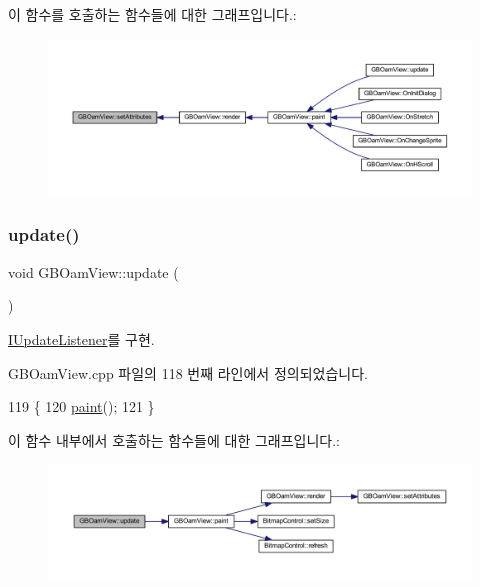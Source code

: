 이 함수를 호출하는 함수들에 대한 그래프입니다.\+:
\nopagebreak
\begin{figure}[H]
\begin{center}
\leavevmode
\includegraphics[width=350pt]{class_g_b_oam_view_a16e71e6ba20139f7ede42b3c884597d7_icgraph}
\end{center}
\end{figure}
\mbox{\label{class_g_b_oam_view_a4e4dc00c48996d9fb2dc1169b65b4cc8}} 
\subsubsection{\texorpdfstring{update()}{update()}}
{\footnotesize\ttfamily void G\+B\+Oam\+View\+::update (\begin{DoxyParamCaption}{ }\end{DoxyParamCaption})\hspace{0.3cm}{\ttfamily [virtual]}}



\mbox{\hyperlink{class_i_update_listener_ac03b85f52e858d0bbd08a4984b2cb929}{I\+Update\+Listener}}를 구현.



G\+B\+Oam\+View.\+cpp 파일의 118 번째 라인에서 정의되었습니다.


\begin{DoxyCode}
119 \{
120   \mbox{\hyperlink{class_g_b_oam_view_a8ed062f5cac9239a17b0f5942a5d9e5b}{paint}}();
121 \}
\end{DoxyCode}
이 함수 내부에서 호출하는 함수들에 대한 그래프입니다.\+:
\nopagebreak
\begin{figure}[H]
\begin{center}
\leavevmode
\includegraphics[width=350pt]{class_g_b_oam_view_a4e4dc00c48996d9fb2dc1169b65b4cc8_cgraph}
\end{center}
\end{figure}
\mbox{\label{class_g_b_oam_view_a20ce1c6ed837362872920c23e281e523}} 
